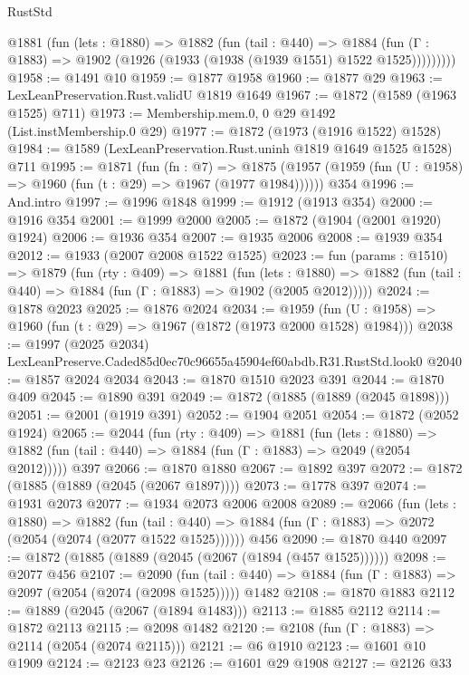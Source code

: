 \begin{lexlean}{RustStd}
\begin{coremodule}
        @1881
          (fun (lets : @1880) =>
          @1882
            (fun (tail : @440) =>
            @1884 (fun (Γ : @1883) => @1902 (@1926 (@1933 (@1938 (@1939 @1551) @1522 @1525)))))))))
@1958 := @1491 @10
@1959 := @1877 @1958
@1960 := @1877 @29
@1963 := LexLeanPreservation.Rust.validU @1819 @1649
@1967 := @1872 (@1589 (@1963 @1525) @711)
@1973 := Membership.mem.{0, 0} @29 @1492 (List.instMembership.{0} @29)
@1977 := @1872 (@1973 (@1916 @1522) @1528)
@1984 := @1589 (LexLeanPreservation.Rust.uninh @1819 @1649 @1525 @1528) @711
@1995 := @1871
    (fun (fn : @7) =>
    @1875 (@1957 (@1959 (fun (U : @1958) => @1960 (fun (t : @29) => @1967 (@1977 @1984))))))
    @354
@1996 := And.intro
@1997 := @1996 @1848
@1999 := @1912 (@1913 @354)
@2000 := @1916 @354
@2001 := @1999 @2000
@2005 := @1872 (@1904 (@2001 @1920) @1924)
@2006 := @1936 @354
@2007 := @1935 @2006
@2008 := @1939 @354
@2012 := @1933 (@2007 @2008 @1522 @1525)
@2023 := fun (params : @1510) =>
  @1879
    (fun (rty : @409) =>
    @1881
      (fun (lets : @1880) =>
      @1882 (fun (tail : @440) => @1884 (fun (Γ : @1883) => @1902 (@2005 @2012)))))
@2024 := @1878 @2023
@2025 := @1876 @2024
@2034 := @1959 (fun (U : @1958) => @1960 (fun (t : @29) => @1967 (@1872 (@1973 @2000 @1528) @1984)))
@2038 := @1997 (@2025 @2034) LexLeanPreserve.Caded85d0ec70c96655a45904ef60abdb.R31.RustStd.look0
@2040 := @1857 @2024 @2034
@2043 := @1870 @1510 @2023 @391
@2044 := @1870 @409
@2045 := @1890 @391
@2049 := @1872 (@1885 (@1889 (@2045 @1898)))
@2051 := @2001 (@1919 @391)
@2052 := @1904 @2051
@2054 := @1872 (@2052 @1924)
@2065 := @2044
    (fun (rty : @409) =>
    @1881
      (fun (lets : @1880) =>
      @1882 (fun (tail : @440) => @1884 (fun (Γ : @1883) => @2049 (@2054 @2012)))))
    @397
@2066 := @1870 @1880
@2067 := @1892 @397
@2072 := @1872 (@1885 (@1889 (@2045 (@2067 @1897))))
@2073 := @1778 @397
@2074 := @1931 @2073
@2077 := @1934 @2073 @2006 @2008
@2089 := @2066
    (fun (lets : @1880) =>
    @1882
      (fun (tail : @440) => @1884 (fun (Γ : @1883) => @2072 (@2054 (@2074 (@2077 @1522 @1525))))))
    @456
@2090 := @1870 @440
@2097 := @1872 (@1885 (@1889 (@2045 (@2067 (@1894 (@457 @1525))))))
@2098 := @2077 @456
@2107 := @2090
    (fun (tail : @440) => @1884 (fun (Γ : @1883) => @2097 (@2054 (@2074 (@2098 @1525)))))
    @1482
@2108 := @1870 @1883
@2112 := @1889 (@2045 (@2067 (@1894 @1483)))
@2113 := @1885 @2112
@2114 := @1872 @2113
@2115 := @2098 @1482
@2120 := @2108 (fun (Γ : @1883) => @2114 (@2054 (@2074 @2115)))
@2121 := @6 @1910
@2123 := @1601 @10 @1909
@2124 := @2123 @23
@2126 := @1601 @29 @1908
@2127 := @2126 @33

\end{coremodule}
\end{lexlean}
